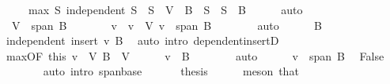 \begin{isabellebody}
\ \ \ \ \ max{\isacharcolon}{\kern0pt}\ {\isachardoublequoteopen}{\isasymAnd}S{\isachardot}{\kern0pt}\ independent\ S\ {\isasymLongrightarrow}\ S\ {\isasymsubseteq}\ V\ {\isasymLongrightarrow}\ B\ {\isasymsubseteq}\ S\ {\isasymLongrightarrow}\ S\ {\isacharequal}{\kern0pt}\ B{\isachardoublequoteclose}\isanewline
\ \ \ \ \isamarkupfalse%
\ auto\isanewline
\ \ \isamarkupfalse%
\isanewline
\ \ \isacommand{{\isacharbraceleft}{\kern0pt}}\isamarkupfalse%
\ \isamarkupfalse%
\ {\isachardoublequoteopen}{\isasymnot}\ V\ {\isasymsubseteq}\ span\ B{\isachardoublequoteclose}\isanewline
\ \ \ \ \isamarkupfalse%
\ \isamarkupfalse%
\ v\ \ {\isachardoublequoteopen}v\ {\isasymin}\ V{\isachardoublequoteclose}\ {\isachardoublequoteopen}v\ {\isasymnotin}\ span\ B{\isachardoublequoteclose}\isanewline
\ \ \ \ \ \ \isamarkupfalse%
\ auto\isanewline
\ \ \ \ \isamarkupfalse%
\ B\ \isamarkupfalse%
\ {\isachardoublequoteopen}independent\ {\isacharparenleft}{\kern0pt}insert\ v\ B{\isacharparenright}{\kern0pt}{\isachardoublequoteclose}\ \isamarkupfalse%
\ {\isacharparenleft}{\kern0pt}auto\ intro{\isacharcolon}{\kern0pt}\ dependent{\isacharunderscore}{\kern0pt}insertD{\isacharparenright}{\kern0pt}\isanewline
\ \ \ \ \isamarkupfalse%
\ max{\isacharbrackleft}{\kern0pt}OF\ this{\isacharbrackright}{\kern0pt}\ {\isacartoucheopen}v\ {\isasymin}\ V{\isacartoucheclose}\ {\isacartoucheopen}B\ {\isasymsubseteq}\ V{\isacartoucheclose}\isanewline
\ \ \ \ \isamarkupfalse%
\ {\isachardoublequoteopen}v\ {\isasymin}\ B{\isachardoublequoteclose}\isanewline
\ \ \ \ \ \ \isamarkupfalse%
\ auto\isanewline
\ \ \ \ \isamarkupfalse%
\ {\isacartoucheopen}v\ {\isasymnotin}\ span\ B{\isacartoucheclose}\ \isamarkupfalse%
\ False\isanewline
\ \ \ \ \ \ \isamarkupfalse%
\ {\isacharparenleft}{\kern0pt}auto\ intro{\isacharcolon}{\kern0pt}\ span{\isacharunderscore}{\kern0pt}base{\isacharparenright}{\kern0pt}\ \isacommand{{\isacharbraceright}{\kern0pt}}\isamarkupfalse%
\isanewline
\ \ \isamarkupfalse%
\ \isamarkupfalse%
\ {\isacharquery}{\kern0pt}thesis\isanewline
\ \ \ \ \isamarkupfalse%
\ {\isacharparenleft}{\kern0pt}meson\ that{\isacharparenright}{\kern0pt}\isanewline
{}\isamarkupfalse%
%
\endisatagproof
{\isafoldproof}%
%
\isadelimproof
\isanewline
%
\endisadelimproof

\end{isabellebody}
